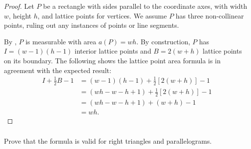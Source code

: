 \documentclass{report}
\begin{document}
  \begin{proof}
    Let $P$ be a rectangle with sides parallel to the coordinate axes, with
      width $w$, height $h$, and lattice points for vertices.
    We assume $P$ has three non-collinear points, ruling out any instances of
      points or line segments.

    By , $P$ is measurable with area $a(P) = wh$.
    By construction, $P$ has $I = (w - 1)(h - 1)$ interior lattice points and
      $B = 2(w + h)$ lattice points on its boundary.
    The following shows the lattice point area formula is in agreement with
      the expected result:
      \begin{align*}
        I + \frac{1}{2}B - 1
          & = (w - 1)(h - 1) + \frac{1}{2}\left[ 2(w + h) \right] - 1 \\
          & = (wh - w - h + 1) + \frac{1}{2}\left[ 2(w + h) \right] - 1 \\
          & = (wh - w - h + 1) + (w + h) - 1 \\
          & = wh.
      \end{align*}
  \end{proof}

\subsubsection{}%

  Prove that the formula is valid for right triangles and parallelograms.
\end{document}
